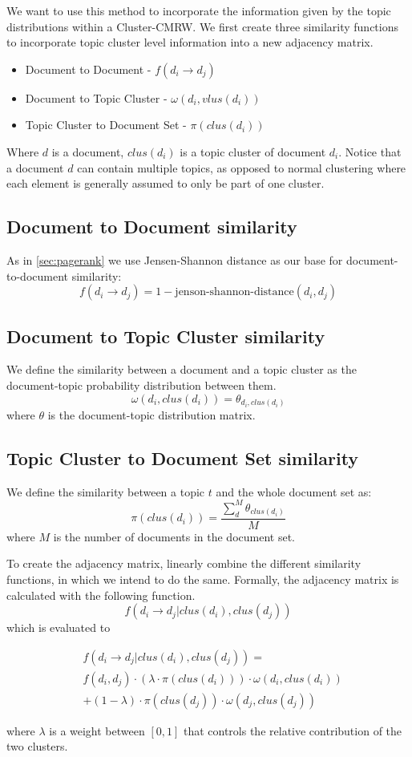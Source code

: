 We want to use this method to incorporate the information given by the topic distributions within a \gls{Cluster-CMRW}. 
We first create three similarity functions to incorporate topic cluster level information into a new adjacency matrix.
\begin{itemize}
    \item Document to Document - $f(d_i \rightarrow d_j)$
    \item Document to Topic Cluster - $\omega(d_i,vlus(d_i))$
    \item Topic Cluster to Document Set - $\pi(clus(d_i))$
\end{itemize}

\noindent
Where $d$ is a document, $clus(d_i)$ is a topic cluster of document $d_i$.
Notice that a document $d$ can contain multiple topics, as opposed to normal clustering where each element is generally assumed to only be part of one cluster.

\subsection*{Document to Document similarity}
As in \autoref{sec:pagerank} we use Jensen-Shannon distance as our base for document-to-document similarity:
$$ f(d_i \rightarrow d_j) = 1 - \text{jenson-shannon-distance}(d_i, d_j)$$ 

\subsection*{Document to Topic Cluster similarity}
We define the similarity between a document and a topic cluster as the document-topic probability distribution between them.
$$ \omega(d_i,clus(d_i)) = \theta_{d_i,clus(d_i)}$$
where $\theta$ is the document-topic distribution matrix.

\subsection*{Topic Cluster to Document Set similarity}
We define the similarity between a topic $t$ and the whole document set as:
$$ \pi(clus(d_i)) = \frac{\sum_{d}^{M} \theta_{clus(d_i)}}{M} $$
where $M$ is the number of documents in the document set.


To create the adjacency matrix, \cite{ClusterPageRank} linearly combine the different similarity functions, in which we intend to do the same.
Formally, the adjacency matrix is calculated with the following function.
$$ f(d_i \rightarrow d_j | clus(d_i), clus(d_j)) $$
which is evaluated to 

\begin{align*}
&f(d_i \rightarrow d_j | clus(d_i), clus(d_j)) = \\
&f(d_i, d_j) \cdot (\lambda \cdot \pi(clus(d_i))) \cdot \omega(d_i, clus(d_i)) \\ 
&+ (1-\lambda) \cdot \pi(clus(d_j)) \cdot \omega(d_j, clus(d_j))
\end{align*}

where $\lambda$ is a weight between $[0,1]$ that controls the relative contribution of the two clusters.
